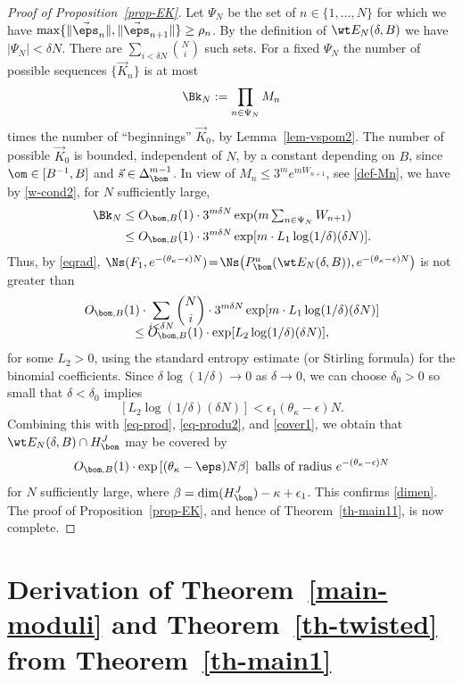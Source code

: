 \begin{proof}[Proof of Proposition~\ref{prop-EK}]
Let $\Psi_N$ be the set of $n\in \{1,\ldots,N\}$ for which
we have $\max\{\|\vec\eps_{n}\|,\|\vec\eps_{{n+1}}\|\}\ge \rho_n$.
By the definition of $\wt E_N(\delta,B)$ we have $|\Psi_N| <\delta N$.
There are $\sum_{i< \delta N} \binom{N}{ i}$ such sets. For a fixed $\Psi_N$ the number of possible sequences $\{\vec K_{n}\}$ is at most
\[
\Bk_N:= \prod_{n\in \Psi_N} M_n
\]
times the number of ``beginnings'' $\vec K_{0}$, by Lemma~\ref{lem-vspom2}.
The number of possible $\vec K_{0}$ is bounded, independent of $N$, by a constant depending on $B$, since $\om\in [B^{-1},B]$ and $\vec s\in \Delta_\bom^{m-1}$.
In view of $M_n \le 3^m e^{mW_{n+1}}$, see \eqref{def-Mn}, we have by \eqref{w-cond2}, for $N$ sufficiently large,
\begin{align*}
\Bk_N &\le O_{\bom,B}(1) \cdot 3^{m\delta N} \exp(m \textstyle\sum_{n\in \Psi_N}W_{n+1})\\
&\le O_{\bom,B}(1) \cdot 3^{m\delta N} \exp[m\cdot L_1\log(1/\delta)(\delta N)].
\end{align*}
Thus, by \eqref{eqrad},
$\Ns(F_1, e^{-(\theta_\kappa-\epsilon)N})\!=\!\Ns\bigl(P_\bom^u(\wt E_N(\delta,B)),e^{-(\theta_\kappa-\epsilon)N}\bigr)$ is not greater than
\begin{multline}
\label{lasta1}
O_{\bom,B}(1)\cdot \sum_{i<\delta N} \binom{N}{i} \cdot 3^{m\delta N} \exp[m\cdot L_1\log(1/\delta)(\delta N)]\\[-8pt]
\le O_{\bom,B}(1)\cdot \exp[L_2 \log(1/\delta)(\delta N)],
\end{multline}
for some $L_2>0$, using the standard entropy estimate (or Stirling formula) for the binomial coefficients. Since $\delta\log(1/\delta)\to 0$ as $\delta\to 0$, we can choose $\delta_0>0$ so small
that $\delta< \delta_0$ implies
\[
\left[L_2\log(1/\delta)(\delta N)\right] < \epsilon_1 (\theta_\kappa-\epsilon)N.
\]
Combining this with \eqref{eq-prod}, \eqref{eq-produ2}, and \eqref{cover1}, we obtain that $\wt E_N(\delta,B)\cap H_\bom^J$ may be covered by
\[
O_{\bom,B}(1)\cdot\exp\left[(\theta_\kappa-\eps)N\beta\right] \text{ balls of radius } e^{-(\theta_\kappa-\epsilon)N}
\]
for $N$ sufficiently large, where $\beta = \dim(H_\bom^J) - \kappa + \epsilon_1$. This confirms \eqref{dimen}.
The proof of Proposition~\ref{prop-EK}, and hence of
Theorem~\ref{th-main11}, is now complete.
\end{proof}

\section{Derivation of Theorem~\ref{main-moduli} and Theorem~\ref{th-twisted} from Theorem~\ref{th-main1} } \label{sec-deriv}

